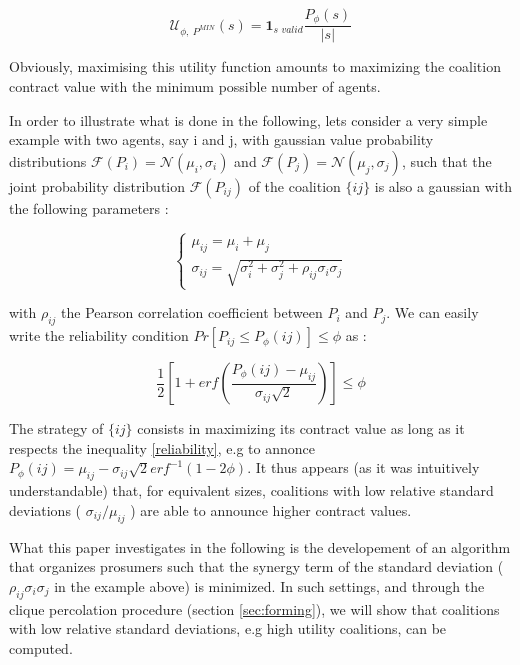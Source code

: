 \documentclass[conference]{IEEEtran}
\begin{document}
\begin{equation}
 \mathcal{U}_{\phi,\ P^{MIN}}(s) = \mathbf{1}_{\textit{s\ valid}} \dfrac{P_{\phi}(s)}{|s|} 
\label{utility}
\end{equation}

Obviously, maximising this utility function amounts to maximizing the coalition contract value with the minimum possible number of agents. 

In order to illustrate what is done in the following, lets consider a very simple example with two agents, say i and j, with gaussian value probability distributions $ \mathcal{F}(P_{i}) = \mathcal{N}(\mu_{i}, \sigma_{i}) $ and $ \mathcal{F}(P_{j}) = \mathcal{N}(\mu_{j}, \sigma_{j}) $, such that the joint probability distribution  $ \mathcal{F}(P_{ij}) $ of the coalition $\{ij\}$ is also a gaussian with the following parameters :

\begin{equation}
\left\{ \begin{array}{lll}
		\mu_{ij} = \mu_{i} + \mu_{j} \\
		\sigma_{ij} = \sqrt{\sigma_{i}^{2} + \sigma_{j}^{2} + \rho_{ij}\sigma_{i}\sigma_{j}}
\end{array} \right.
\label{parameters}
\end{equation}

with $ \rho_{ij} $ the Pearson correlation coefficient between $ P_{i} $ and $ P_{j} $. We can easily write the reliability condition $ Pr[P_{ij} \leq P_{\phi}(ij) ] \leq \phi $ as :

\begin{equation}
\dfrac{1}{2} \left[ 1+ erf \left( \dfrac{P_{\phi}(ij) - \mu_{ij}}{\sigma_{ij}\sqrt{2}} \right) \right] \leq \phi
\label{reliability}
\end{equation}

The strategy of $ \{ij\} $ consists in maximizing its contract value as long as it respects the inequality \ref{reliability}, e.g to annonce $ P_{\phi}(ij) = \mu_{ij} - \sigma_{ij}\sqrt{2}erf^{-1}(1-2 \phi ) $. It thus appears (as it was intuitively understandable) that, for equivalent sizes, coalitions with low relative standard deviations ( $ \sigma_{ij} / \mu_{ij} $ ) are able to announce higher contract values. 

What this paper investigates in the following is the developement of an algorithm that organizes prosumers such that the synergy term of the standard deviation ($ \rho_{ij}\sigma_{i}\sigma_{j} $ in the example above) is minimized. In such settings, and through the clique percolation procedure (section \ref{sec:forming}), we will show that coalitions with low relative standard deviations, e.g high utility coalitions, can be computed.
\end{document}
